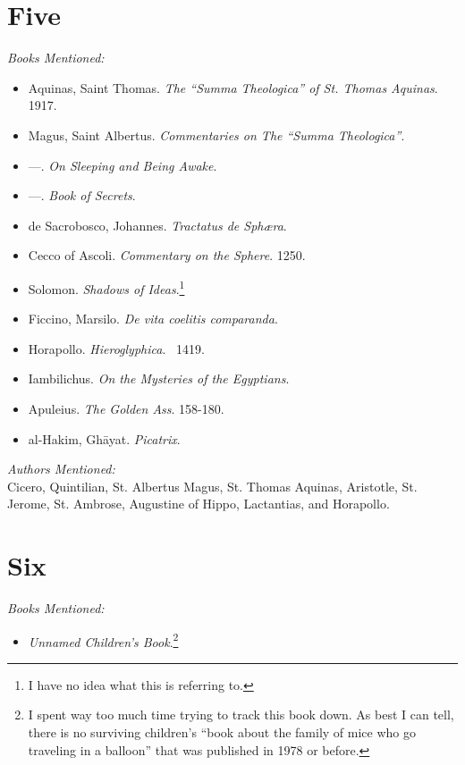 \documentclass[twoside,10pt]{report}
\begin{document}
\section{Five}
\textit{Books Mentioned:}
\begin{itemize}
\item Aquinas, Saint Thomas. \textit{The “Summa Theologica” of St. Thomas Aquinas}. 1917.\cite{Thomas1917}
\item Magus, Saint Albertus. \textit{Commentaries on The “Summa Theologica”}.\cite{Magus}
\item ---. \textit{On Sleeping and Being Awake}.
\item ---. \textit{Book of Secrets}.
\item de Sacrobosco, Johannes. \textit{Tractatus de Sphæra}.\cite{De}
\item Cecco of Ascoli. \textit{Commentary on the Sphere}. 1250.\cite{Cecco1250}
\item Solomon. \textit{Shadows of Ideas}.\footnote{I have no idea what this is referring to.}
\item Ficcino, Marsilo. \textit{De vita coelitis comparanda}.\cite{Ficcino}
\item Horapollo. \textit{Hieroglyphica}. ~1419.\cite{Horapollo}
\item Iambilichus. \textit{On the Mysteries of the Egyptians}.\cite{Iambilichus}
\item Apuleius. \textit{The Golden Ass}. 158-180.\cite{Apuleius1998}
\item al-Hakim, Ghāyat. \textit{Picatrix}.\cite{Picatrix1962}
\end{itemize}
\textit{Authors Mentioned:}\\
Cicero, Quintilian, St. Albertus Magus, St. Thomas Aquinas, Aristotle, St. Jerome, St. Ambrose, Augustine of Hippo, Lactantias, and Horapollo.

\section{Six}
\textit{Books Mentioned:}
\begin{itemize}
\item \textit{Unnamed Children’s Book}.\footnote{I spent way too much time trying to track this book down. As best I can tell, there is no surviving children’s “book about the family of mice who go traveling in a balloon” that was published in 1978 or before.}
\end{itemize}
\end{document}
